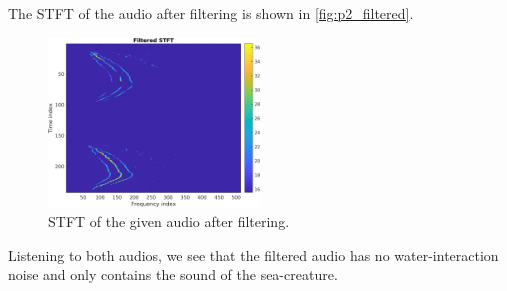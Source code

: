 \documentclass{article}
\begin{document}
The STFT of the audio after filtering is shown in \autoref{fig:p2_filtered}.
\begin{figure}[ht!]
    \centering
    \includegraphics[width=0.5\textwidth]{filtered_signal.png}
    \caption{STFT of the given audio after filtering.}
    \label{fig:p2_filtered}
\end{figure}

Listening to both audios, we see that the filtered audio has no water-interaction noise and only contains the sound of the sea-creature.

\end{document}
